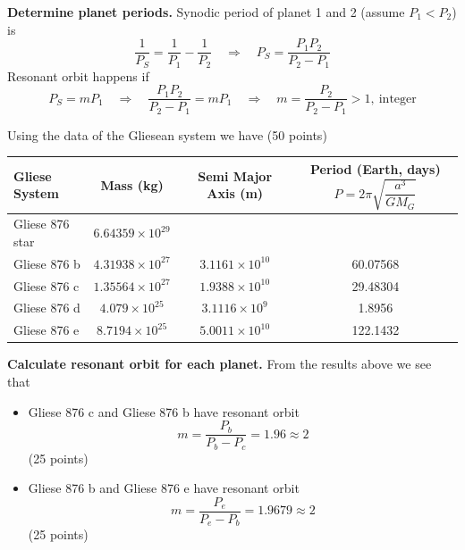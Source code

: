 \textbf{Determine planet periods.}
Synodic period of planet 1 and 2 (assume $P_1 < P_2$) is
\[ \frac{1}{P_S} = \frac{1}{P_1} - \frac{1}{P_2}
   \quad\Rightarrow\quad
   P_S = \frac{P_1 P_2}{P_2 - P_1} \]
Resonant orbit happens if
\[ P_S = mP_1
   \quad\Rightarrow\quad
   \frac{P_1 P_2}{P_2 - P_1} = mP_1
   \quad\Rightarrow\quad
   m = \frac{P_2}{P_2 - P_1} > 1,\ \text{integer} \]

Using the data of the Gliesean system we have
\hfill(50 points)

\begin{center}
\begin{tabular}{|l|c|c|c|}
\hline
\textbf{Gliese System} & \textbf{Mass (kg)} & \textbf{Semi Major Axis (m)}
  & \textbf{Period (Earth, days)} $P = 2\pi\sqrt{\dfrac{a^3}{GM_G}}$ \\
\hline
Gliese 876 star & $6.64359 \times 10^{29}$ & & \\
\hline
Gliese 876 b & $4.31938 \times 10^{27}$ & $3.1161 \times 10^{10}$ & 60.07568 \\
\hline
Gliese 876 c & $1.35564 \times 10^{27}$ & $1.9388 \times 10^{10}$ & 29.48304 \\
\hline
Gliese 876 d & $4.079 \times 10^{25}$ & $3.1116 \times 10^{9}$ & 1.8956 \\
\hline
Gliese 876 e & $8.7194 \times 10^{25}$ & $5.0011 \times 10^{10}$ & 122.1432 \\
\hline
\end{tabular}
\end{center}

\textbf{Calculate resonant orbit for each planet.}
From the results above we see that
\begin{itemize}
\item Gliese 876 c and Gliese 876 b have resonant orbit
  \[ m = \frac{P_b}{P_b - P_c} = 1.96 \approx 2 \]
  \hfill(25 points)
\item Gliese 876 b and Gliese 876 e have resonant orbit
  \[ m = \frac{P_e}{P_e - P_b} = 1.9679 \approx 2 \]
  \hfill(25 points)
\end{itemize}

